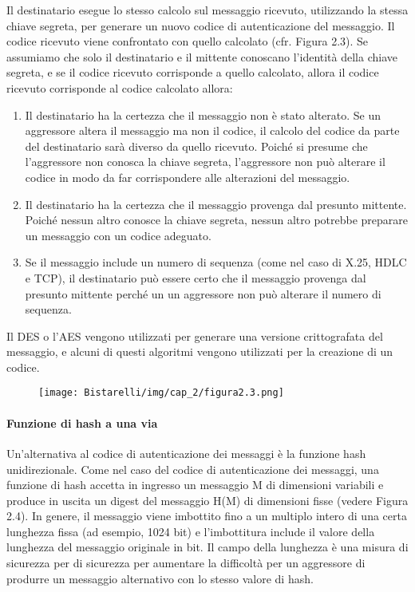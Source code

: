 \singlespacing

Il destinatario esegue lo stesso calcolo sul messaggio ricevuto, utilizzando la stessa chiave segreta, per generare un nuovo codice di autenticazione del messaggio.
Il codice ricevuto viene confrontato con quello calcolato (cfr. Figura 2.3). Se assumiamo che solo il destinatario e il mittente conoscano l'identità della chiave segreta, e se il codice ricevuto corrisponde a quello calcolato, allora il codice ricevuto corrisponde al codice calcolato allora:

\begin{enumerate}
    \item Il destinatario ha la certezza che il messaggio non è stato alterato. Se un aggressore altera il messaggio ma non il codice, il calcolo del codice da parte del destinatario sarà diverso da quello ricevuto. Poiché si presume che l'aggressore non conosca la chiave segreta, l'aggressore non può alterare il codice in modo da far corrispondere alle alterazioni del messaggio.
    
    \item Il destinatario ha la certezza che il messaggio provenga dal presunto mittente. Poiché nessun altro conosce la chiave segreta, nessun altro potrebbe preparare un messaggio con un codice adeguato.

    \item  Se il messaggio include un numero di sequenza (come nel caso di X.25, HDLC e TCP), il destinatario può essere certo che il messaggio provenga dal presunto mittente perché un un aggressore non può alterare il numero di sequenza.

\end{enumerate}
Il DES o l'AES vengono utilizzati per generare una versione crittografata del messaggio, e alcuni di questi algoritmi vengono utilizzati per la creazione di un codice.

\begin{figure}[H]
	\centering
    \texttt{[image: Bistarelli/img/cap\_2/figura2.3.png]}
\end{figure}

\paragraph{Funzione di hash a una via} Un'alternativa al codice di autenticazione dei messaggi è la funzione hash unidirezionale. Come nel caso del codice di autenticazione dei messaggi, una funzione di hash accetta in ingresso un messaggio M di dimensioni variabili e produce in uscita un digest del messaggio H(M) di dimensioni fisse (vedere Figura 2.4). In genere, il messaggio viene imbottito fino a un multiplo intero di una certa lunghezza fissa (ad esempio, 1024 bit) e l'imbottitura include il valore della lunghezza del messaggio originale in bit. Il campo della lunghezza è una misura di sicurezza per di sicurezza per aumentare la difficoltà per un aggressore di produrre un messaggio alternativo con lo stesso valore di hash.

